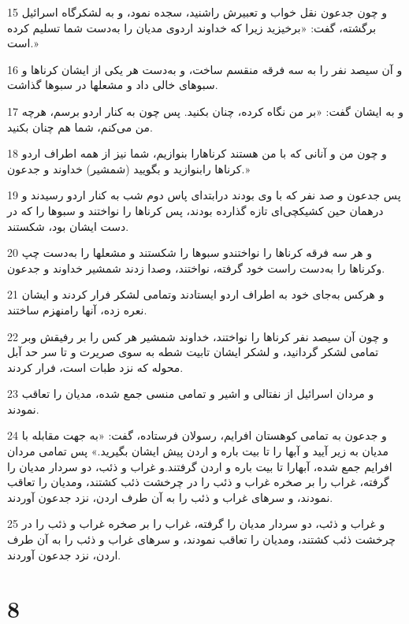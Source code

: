 \par 15 و چون جدعون نقل خواب و تعبیرش راشنید، سجده نمود، و به لشکرگاه اسرائیل برگشته، گفت: «برخیزید زیرا که خداوند اردوی مدیان را به‌دست شما تسلیم کرده است.»
\par 16 و آن سیصد نفر را به سه فرقه منقسم ساخت، و به‌دست هر یکی از ایشان کرناها و سبوهای خالی داد و مشعلها در سبوها گذاشت.
\par 17 و به ایشان گفت: «بر من نگاه کرده، چنان بکنید. پس چون به کنار اردو برسم، هر‌چه من می‌کنم، شما هم چنان بکنید.
\par 18 و چون من و آنانی که با من هستند کرناهارا بنوازیم، شما نیز از همه اطراف اردو کرناها رابنوازید و بگویید (شمشیر) خداوند و جدعون.»
\par 19 پس جدعون و صد نفر که با وی بودند درابتدای پاس دوم شب به کنار اردو رسیدند و درهمان حین کشیکچی‌ای تازه گذارده بودند، پس کرناها را نواختند و سبوها را که در دست ایشان بود، شکستند.
\par 20 و هر سه فرقه کرناها را نواختندو سبوها را شکستند و مشعلها را به‌دست چپ وکرناها را به‌دست راست خود گرفته، نواختند، وصدا زدند شمشیر خداوند و جدعون.
\par 21 و هرکس به‌جای خود به اطراف اردو ایستادند وتمامی لشکر فرار کردند و ایشان نعره زده، آنها رامنهزم ساختند.
\par 22 و چون آن سیصد نفر کرناها را نواختند، خداوند شمشیر هر کس را بر رفیقش وبر تمامی لشکر گردانید، و لشکر ایشان تابیت شطه به سوی صریرت و تا سر حد آبل محوله که نزد طبات است، فرار کردند.
\par 23 و مردان اسرائیل از نفتالی و اشیر و تمامی منسی جمع شده، مدیان را تعاقب نمودند.
\par 24 و جدعون به تمامی کوهستان افرایم، رسولان فرستاده، گفت: «به جهت مقابله با مدیان به زیر آیید و آبها را تا بیت باره و اردن پیش ایشان بگیرید.» پس تمامی مردان افرایم جمع شده، آبهارا تا بیت باره و اردن گرفتند.و غراب و ذئب، دو سردار مدیان را گرفته، غراب را بر صخره غراب و ذئب را در چرخشت ذئب کشتند، ومدیان را تعاقب نمودند، و سرهای غراب و ذئب را به آن طرف اردن، نزد جدعون آوردند.
\par 25 و غراب و ذئب، دو سردار مدیان را گرفته، غراب را بر صخره غراب و ذئب را در چرخشت ذئب کشتند، ومدیان را تعاقب نمودند، و سرهای غراب و ذئب را به آن طرف اردن، نزد جدعون آوردند.
 
\chapter{8}

